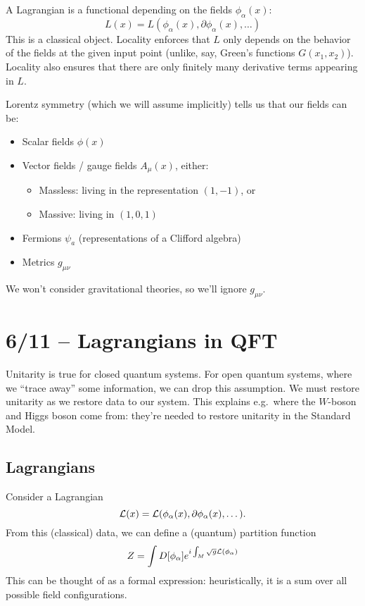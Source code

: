 A Lagrangian is a functional depending on the fields $\phi_\alpha(x)$:
\[
	L(x) = L(\phi_\alpha(x), \partial \phi_\alpha(x), \dots)
\]
This is a classical object.
Locality enforces that $L$ only depends on the behavior of the fields at the given input point (unlike, say, Green's functions $G(x_1, x_2)$).
Locality also ensures that there are only finitely many derivative terms appearing in $L$.

Lorentz symmetry (which we will assume implicitly) tells us that our fields can be:
\begin{itemize}
	\item Scalar fields $\phi(x)$
	\item Vector fields / gauge fields $A_\mu(x)$, either:
		\begin{itemize}
			\item Massless: living in the representation $(1, -1)$, or
			\item Massive: living in $(1, 0, 1)$
		\end{itemize}
	\item Fermions $\psi_a$ (representations of a Clifford algebra)
	\item Metrics $g_{\mu \nu}$
\end{itemize}
We won't consider gravitational theories, so we'll ignore $g_{\mu \nu}$.

\section{6/11 -- Lagrangians in QFT}

Unitarity is true for closed quantum systems.
For open quantum systems, where we ``trace away'' some information, we can drop this assumption.
We must restore unitarity as we restore data to our system.
This explains e.g.\ where the $W$-boson and Higgs boson come from: they're needed to restore unitarity in the Standard Model.

\subsection{Lagrangians}

Consider a Lagrangian
\[
	\mathcal{L}(x) = \mathcal{L}(\phi_\alpha(x), \partial \phi_\alpha(x), \dots).
\]
From this (classical) data, we can define a (quantum) partition function
\[
	Z = \int D[\phi_\alpha] e^{i \int_M \sqrt{g} \mathcal{L}(\phi_\alpha)}
\]
This can be thought of as a formal expression: heuristically, it is a sum over all possible field configurations.

